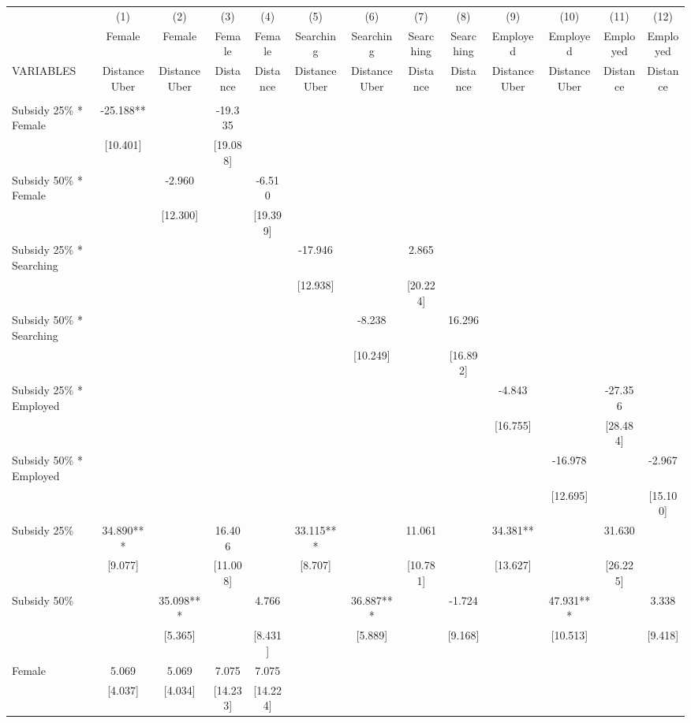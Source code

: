 \begin{tabular}{lcccccccccccc} \hline
 & (1) & (2) & (3) & (4) & (5) & (6) & (7) & (8) & (9) & (10) & (11) & (12) \\
 & Female & Female & Female & Female & Searching & Searching & Searching & Searching & Employed & Employed & Employed & Employed \\
VARIABLES & Distance Uber & Distance Uber & Distance & Distance & Distance Uber & Distance Uber & Distance & Distance & Distance Uber & Distance Uber & Distance & Distance \\ \hline
 &  &  &  &  &  &  &  &  &  &  &  &  \\
Subsidy 25\% * Female & -25.188** &  & -19.335 &  &  &  &  &  &  &  &  &  \\
 & [10.401] &  & [19.088] &  &  &  &  &  &  &  &  &  \\
Subsidy 50\% * Female &  & -2.960 &  & -6.510 &  &  &  &  &  &  &  &  \\
 &  & [12.300] &  & [19.399] &  &  &  &  &  &  &  &  \\
Subsidy 25\% * Searching &  &  &  &  & -17.946 &  & 2.865 &  &  &  &  &  \\
 &  &  &  &  & [12.938] &  & [20.224] &  &  &  &  &  \\
Subsidy 50\% * Searching &  &  &  &  &  & -8.238 &  & 16.296 &  &  &  &  \\
 &  &  &  &  &  & [10.249] &  & [16.892] &  &  &  &  \\
Subsidy 25\% * Employed &  &  &  &  &  &  &  &  & -4.843 &  & -27.356 &  \\
 &  &  &  &  &  &  &  &  & [16.755] &  & [28.484] &  \\
Subsidy 50\% * Employed &  &  &  &  &  &  &  &  &  & -16.978 &  & -2.967 \\
 &  &  &  &  &  &  &  &  &  & [12.695] &  & [15.100] \\
Subsidy 25\% & 34.890*** &  & 16.406 &  & 33.115*** &  & 11.061 &  & 34.381** &  & 31.630 &  \\
 & [9.077] &  & [11.008] &  & [8.707] &  & [10.781] &  & [13.627] &  & [26.225] &  \\
Subsidy 50\% &  & 35.098*** &  & 4.766 &  & 36.887*** &  & -1.724 &  & 47.931*** &  & 3.338 \\
 &  & [5.365] &  & [8.431] &  & [5.889] &  & [9.168] &  & [10.513] &  & [9.418] \\
Female & 5.069 & 5.069 & 7.075 & 7.075 &  &  &  &  &  &  &  &  \\
 & [4.037] & [4.034] & [14.233] & [14.224] &  &  &  &  &  &  &  &  \\

\end{tabular}
